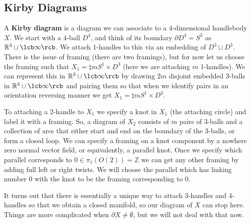 \subsection{Kirby Diagrams}
\label{Kirby Diagrams}


A \textbf{Kirby diagram} is a diagram we can associate to a 4-dimensional handlebody $X$. We start with a 4-ball $D^4$, and think of its boundary $\partial D^4 = S^3$ as $\mathbb R^3 \cup \lcb \infty \rcb$. We attach 1-handles to this via an embedding of $D^3 \sqcup D^3$. There is the issue of framing (there are two framings), but for now let us choose the framing such that $X_1 = \natural m S^1 \times D^3$ (here we are attaching $m$ 1-handles). We can represent this in $\mathbb R^3 \cup \lcb \infty\rcb$ by drawing $2m$ disjoint embedded 3-balls in $\mathbb R^3 \cup\lcb\infty\rcb$ and pairing them so that when we identify pairs in an orientation reversing manner we get $X_1 = \natural m S^1 \times D^3$. 

To attaching a 2-handle to $X_1$ we specify a knot in $X_1$ (the attaching circle) and label it with a framing. So, a diagram of $X_2$ consists of $m$ pairs of 3-balls and a collection of arcs that either start and end on the boundary of the 3-balls, or form a closed loop. We can specify a framing on a knot component by a nowhere zero normal vector field, or equivalently, a parallel knot. Once we specify which parallel corresponds to $0 \in \pi_1(O(2))=\mathbb Z$ we can get any other framing by adding full left or right twists. We will choose the parallel which has linking number 0 with the knot to be the framing corresponding to $0$. 

It turns out that there is essentially a unique way to attach 3-handles and 4-handles so that we obtain a closed manifold, so our diagram of $X$ can stop here. Things are more complicated when $\partial X \neq \emptyset$, but we will not deal with that now.






